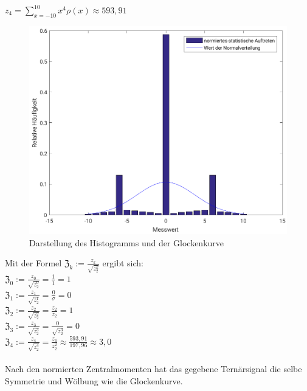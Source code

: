 \documentclass[fleqn,a4paper,12pt]{article}
\begin{document}
	$z_4 = \sum_{x=-10}^{10} x^4\rho(x) \approx  593,91$\\
	\newpage
	\begin{figure}
		\includegraphics[scale = 0.9]{A08_Histogramm.png}
		\caption{Darstellung des Histogramms und der Glockenkurve}
	\end{figure}
	Mit der Formel $\mathfrak{Z}_k := \frac{z_k}{\sqrt{z_2^k}}$ ergibt sich:\\
	$\mathfrak{Z}_0 := \frac{z_0}{\sqrt{z_2^0}} = \frac{1}{1} = 1$\\
	$\mathfrak{Z}_1 := \frac{z_1}{\sqrt{z_2^1}} = \frac{0}{\sigma} = 0$\\
	$\mathfrak{Z}_2 := \frac{z_2}{\sqrt{z_2^2}} = \frac{z_2}{z_2} = 1$\\
	$\mathfrak{Z}_3 := \frac{z_3}{\sqrt{z_2^3}} = \frac{0}{\sqrt{z_2^3}} = 0$\\
	$\mathfrak{Z}_4 := \frac{z_4}{\sqrt{z_2^4}} = \frac{z_4}{z_2^2} \approx \frac{593,91}{197,96} \approx 3,0$\\
	\\
	Nach den normierten Zentralmomenten hat das gegebene Ternärsignal die selbe Symmetrie und Wölbung wie die Glockenkurve.	
\end{document}
